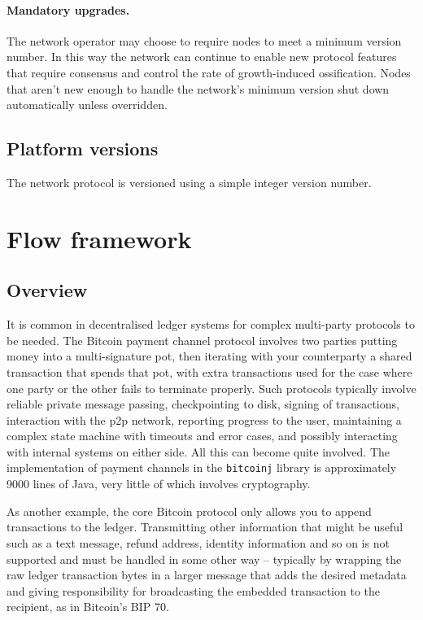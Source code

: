 \documentclass{article}
\begin{document}
\paragraph{Mandatory upgrades.}The network operator may choose to require nodes to meet a minimum version number.
In this way the network can continue to enable new protocol features that require consensus and control the rate of
growth-induced ossification. Nodes that aren't new enough to handle the network's minimum version shut down
automatically unless overridden.

\subsection{Platform versions}\label{subsec:platform-versions}

The network protocol is versioned using a simple integer version number.

\section{Flow framework}\label{sec:flows}

\subsection{Overview}

It is common in decentralised ledger systems for complex multi-party protocols to be needed. The Bitcoin payment
channel protocol\cite{PaymentChannels} involves two parties putting money into a multi-signature pot, then
iterating with your counterparty a shared transaction that spends that pot, with extra transactions used for the
case where one party or the other fails to terminate properly. Such protocols typically involve reliable private
message passing, checkpointing to disk, signing of transactions, interaction with the p2p network, reporting
progress to the user, maintaining a complex state machine with timeouts and error cases, and possibly interacting
with internal systems on either side. All this can become quite involved. The implementation of payment channels in
the \texttt{bitcoinj} library is approximately 9000 lines of Java, very little of which involves cryptography.

As another example, the core Bitcoin protocol only allows you to append transactions to the ledger. Transmitting
other information that might be useful such as a text message, refund address, identity information and so on is
not supported and must be handled in some other way -- typically by wrapping the raw ledger transaction bytes in a
larger message that adds the desired metadata and giving responsibility for broadcasting the embedded transaction
to the recipient, as in Bitcoin's BIP 70\cite{BIP70}.
\end{document}
